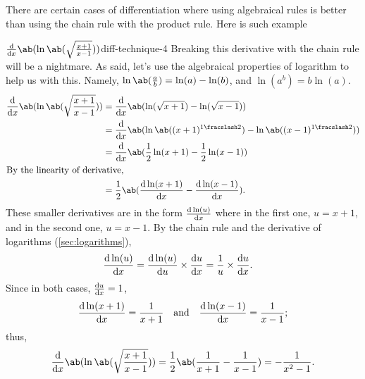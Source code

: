 There are certain cases of differentiation where using algebraical rules is better than using the chain rule with the product rule. Here is such example
\begin{exmp}{$\odv*{\ab(\ln\ab(\sqrt{\frac{x + 1}{x - 1}}))}{x}$}{diff-technique-4}
  Breaking this derivative with the chain rule will be a nightmare. As said, let's use the algebraical properties of logarithm to help us with this. Namely, $\ln\ab(\frac{a}{b}) = \ln(a) - \ln(b)$, and $\ln(a^b) = b\ln(a)$.
  \begin{align}
    \odv*{\ab(\ln\ab(\sqrt{\frac{x + 1}{x - 1}}))}{x} & = \odv*{\ab(\ln(\sqrt{x + 1}) - \ln(\sqrt{x - 1}))}{x}                                 \\
                                                      & = \odv*{\ab(\ln\ab((x + 1)^{\flatfrac{1}{2}}) - \ln\ab((x - 1)^{\flatfrac{1}{2}}))}{x} \\
                                                      & = \odv*{\ab(\frac{1}{2}\ln(x + 1) - \frac{1}{2}\ln(x - 1))}{x}                         \\
    \intertext{By the linearity of derivative,}
                                                      & = \frac{1}{2}\ab(\odv{\ln(x + 1)}{x} - \odv{\ln(x - 1)}{x}).
  \end{align}
  These smaller derivatives are in the form $\odv{\ln(u)}{x}$ where in the first one, $u = x + 1$, and in the second one, $u = x - 1$. By the chain rule and the derivative of logarithms (\cref{sec:logarithms}),
  \begin{align}
    \odv{\ln(u)}{x} & = \odv{\ln(u)}{u}\times\odv{u}{x} = \frac{1}{u}\times\odv{u}{x}.
  \end{align}
  Since in both cases, $\odv{u}{x} = 1$,
  \begin{equation}
    \odv{\ln(x + 1)}{x} = \frac{1}{x + 1} \mathand \odv{\ln(x - 1)}{x} = \frac{1}{x - 1};
  \end{equation}
  thus,
  \begin{align}
    \odv*{\ab(\ln\ab(\sqrt{\frac{x + 1}{x - 1}}))}{x} = \frac{1}{2}\ab(\frac{1}{x + 1} - \frac{1}{x - 1}) = -\frac{1}{x^2 - 1}.
  \end{align}
\end{exmp}

